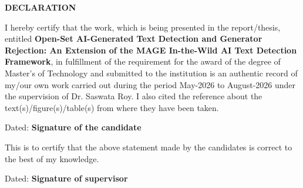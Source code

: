 \begin{center}
{\Large \bf DECLARATION}
\end{center}
\vspace{0.8cm}
\noindent I hereby certify that the work, which is being presented in the report/thesis, entitled {\bf Open-Set AI-Generated Text Detection and Generator Rejection: An Extension of the MAGE In-the-Wild AI Text Detection Framework}, in fulfillment of the requirement for the award of the degree of Master's of Technology and submitted to the institution is an authentic record of my/our own work carried out during the period May-2026 to August-2026 under the supervision of Dr. Saswata Roy. I also cited the reference about the text(s)/figure(s)/table(s) from where they have been taken.

\vspace{2.5cm}

\noindent Dated: \hfill {\bf Signature of the candidate}

\vspace{2cm}

\noindent This is to certify that the above statement made by the candidates is correct to the best of my knowledge.

\vspace{2.5cm}

\noindent Dated: \hfill {\bf Signature of supervisor}
